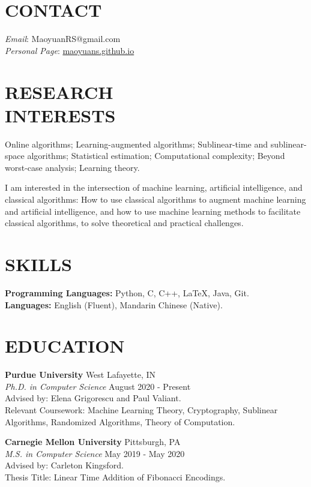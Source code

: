 \documentclass[margin, 10pt]{res-short} %
\begin{document}
\begin{resume}

\section{CONTACT}
\emph{Email}: MaoyuanRS@gmail.com\\
\emph{Personal Page}: \href{https://maoyuans.github.io}{maoyuans.github.io}

 
\section{RESEARCH \\ INTERESTS}  

Online algorithms; Learning-augmented algorithms; Sublinear-time and sublinear-space algorithms; Statistical estimation; Computational complexity; Beyond worst-case analysis; Learning theory.

I am interested in the intersection of machine learning, artificial intelligence, and classical algorithms: How to use classical algorithms to augment machine learning and artificial intelligence, and how to use machine learning methods to facilitate classical algorithms, to solve theoretical and practical challenges.

\section{SKILLS}

{\bf Programming Languages:} Python, C, C++, LaTeX, Java, Git.\\
{\bf Languages:} English (Fluent), Mandarin Chinese (Native).
 
\section{EDUCATION}

{\bf Purdue University} \hfill West Lafayette, IN \\
\emph{Ph.D. in Computer Science} \hfill August 2020 - Present\\
Advised by: Elena Grigorescu and Paul Valiant.\\
Relevant Coursework: Machine Learning Theory, Cryptography, Sublinear Algorithms, Randomized Algorithms, Theory of Computation.

{\bf Carnegie Mellon University} \hfill Pittsburgh, PA \\
\emph{M.S. in Computer Science} \hfill May 2019 - May 2020 \\
Advised by: Carleton Kingsford.\\
Thesis Title: Linear Time Addition of Fibonacci Encodings.


\end{resume}
\end{document}

